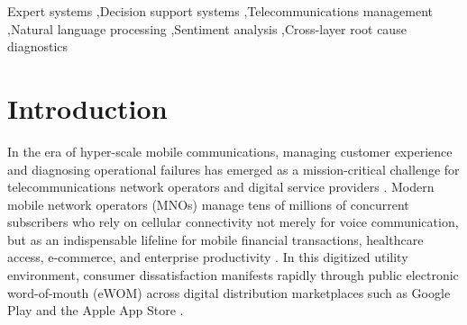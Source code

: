 \documentclass[5p,twocolumn,authoryear]{elsarticle}
\begin{document}
\begin{frontmatter}
\begin{keyword}
Expert systems \sep Decision support systems \sep Telecommunications management \sep Natural language processing \sep Sentiment analysis \sep Cross-layer root cause diagnostics
\end{keyword}

\end{frontmatter}

\section{Introduction}
\label{sec:introduction}

In the era of hyper-scale mobile communications, managing customer experience and diagnosing operational failures has emerged as a mission-critical challenge for telecommunications network operators and digital service providers \citep{liao2005expert, sutherland2014role}. Modern mobile network operators (MNOs) manage tens of millions of concurrent subscribers who rely on cellular connectivity not merely for voice communication, but as an indispensable lifeline for mobile financial transactions, healthcare access, e-commerce, and enterprise productivity \citep{gsma2024mobile, itu2024measuring}. In this digitized utility environment, consumer dissatisfaction manifests rapidly through public electronic word-of-mouth (eWOM) across digital distribution marketplaces such as Google Play and the Apple App Store \citep{dellarocas2003digitization, hennig2004electronic}.
\end{document}

